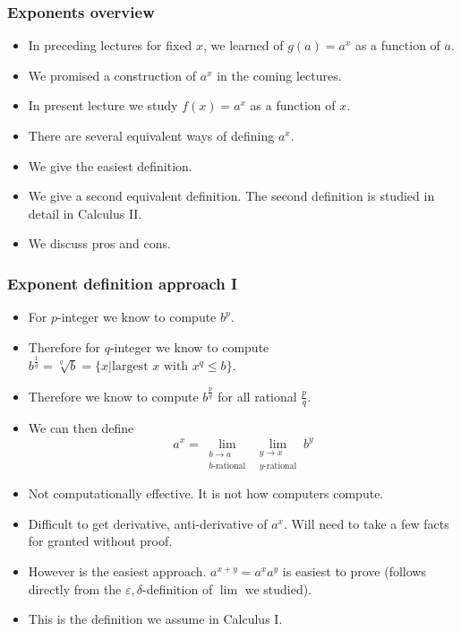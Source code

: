 \begin{frame}
\frametitle{Exponents overview}
\begin{itemize}
\item<1-> In preceding lectures for fixed $x$, we learned of $g(a) =a^{x}$ as a function of $a$.
\item<2-> We promised a construction of $a^x$ in the coming lectures.
\item<3-> In present lecture we study $f(x)=a^x$ as a function of $x$.
\item<4-> There are several equivalent ways of defining $a^x$. 
\item<5-> We give the easiest definition. 
\item<6->We give a second equivalent definition. The second definition is studied in detail in Calculus II. 
\item<7->We discuss pros and cons.
\end{itemize}
\end{frame}
\begin{frame}
\frametitle{Exponent definition approach I}
\begin{itemize}
\item<1-> For $p$-integer we know to compute $b^p$.
\item<2-> Therefore for $q$-integer we know to compute $b^{\frac{1}{q}}= \sqrt[q]{b}=\{x|\text{largest~}x\text{~with~} x^q\leq b\}$.
\item<3-> Therefore we know to compute $b^{\frac{p}{q}}$ for all rational $\frac{p}{q}$.
\item<4-> We can then define
\[
a^x = \lim\limits_{\substack{b \to a \\ b\text{-rational}}} \lim\limits_{\substack{y \to x \\ y\text{-rational}}} b^y 
\]
\item<5-> Not computationally effective. It is not how computers compute.
\item<6-> Difficult to get derivative, anti-derivative of $a^x$. Will need to take a few facts for granted without proof.
\item<7-> However is the easiest approach. $a^{x+y}=a^xa^y$ is easiest to prove (follows directly from the $\varepsilon, \delta$-definition of $\lim$ we studied).
\item<8->\alert<8->{This is the definition we assume in Calculus I.}
\end{itemize}
\end{frame}
